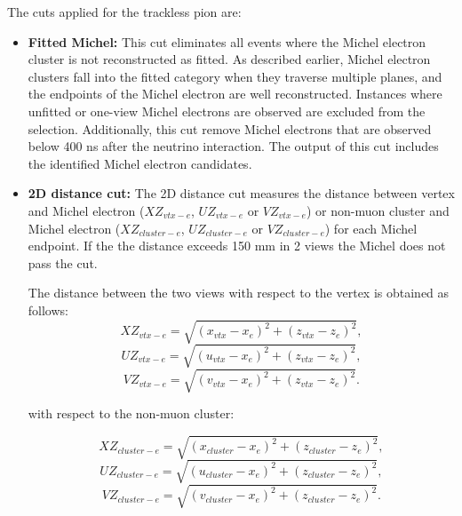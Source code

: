 The cuts applied for the trackless pion are:

\begin{itemize}
    \item \textbf{Fitted Michel:} This cut eliminates all events where the Michel electron cluster is not reconstructed as fitted. As described earlier, Michel electron clusters fall into the fitted category when they traverse multiple planes, and the endpoints of the Michel electron are well reconstructed. Instances where unfitted or one-view Michel electrons are observed are excluded from the selection. Additionally, this cut remove Michel electrons that are observed below 400 ns after the neutrino interaction. The output of this cut includes the identified Michel electron candidates.

    \item \textbf{2D distance cut:} The 2D distance cut measures the distance between vertex and Michel electron ($XZ_{vtx-e}$, $UZ_{vtx-e}$ or $VZ_{vtx-e}$) or non-muon cluster  and Michel electron ($XZ_{cluster-e}$, $UZ_{cluster-e}$ or $VZ_{cluster-e}$) for each Michel endpoint. If the the distance exceeds 150 mm in 2 views the Michel does not pass the cut. 
    
    The distance between the two views with respect to the vertex is obtained as follows: \begin{equation}
        XZ_{vtx-e} = \sqrt{(x_{vtx}-x_e)^2 + (z_{vtx}-z_e)^2},
    \end{equation}
        \begin{equation}
        UZ_{vtx-e} = \sqrt{(u_{vtx}-x_e)^2 + (z_{vtx}-z_e)^2},
    \end{equation}
        \begin{equation}
        VZ_{vtx-e} = \sqrt{(v_{vtx}-x_e)^2 + (z_{vtx}-z_e)^2}.
    \end{equation}

     with respect to the non-muon cluster:

    \begin{equation}
        XZ_{cluster-e} = \sqrt{(x_{cluster}-x_e)^2 + (z_{cluster}-z_e)^2},
    \end{equation}
        \begin{equation}
        UZ_{cluster-e} = \sqrt{(u_{cluster}-x_e)^2 + (z_{cluster}-z_e)^2},
    \end{equation}
        \begin{equation}
        VZ_{cluster-e} = \sqrt{(v_{cluster}-x_e)^2 + (z_{cluster}-z_e)^2}.
    \end{equation}


\end{itemize}

